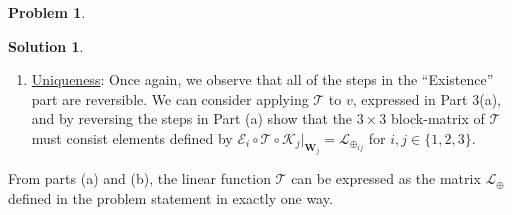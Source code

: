 \documentclass{article}
\theoremstyle{definition}
\newtheorem*{prob*}{Problem}
\newtheorem*{sln*}{Solution}
\newcommand{\V}{\mathbf{V}}
\newcommand{\W}{\mathbf{W}}
\newcommand{\lag}{\mathcal{L}}
\newcommand{\K}{\mathcal{K}}
\newcommand{\E}{\mathcal{E}}
\newcommand{\T}{\mathcal{T}}
\begin{document}
\begin{prob*}
\begin{sln*}
\begin{enumerate}
\begin{enumerate}
\begin{align*}
\begin{bmatrix}
				\Pi_3 \circ \maltese^{-1}\circ \T (w_1) 
				\end{bmatrix}\right)\\
				&= 
				\maltese\circ\maltese^{-1}\circ \T(w_1),\hspace{0.2cm}\text{by Part 2(a) of Problem 1}\\
				&= \T(w_1)
				\end{align*} 
				By the definition of $\maltese$, we can write this as
				\begin{align*}
				\lag(w_1 + \mathbf{0}_\V + \mathbf{0}_\V) = \lag(w_1) = \T(w_1).
				\end{align*}
				In general, the equality above also holds if we start with any $v = w_1 + w_2 + w_3 \in \V$ with $w_i \in \W_i$ for $i=\{1,2,3\}$, because as we have shown in Part 2(a) of Problem 1, $v$ can be written as
				\begin{align*}
				v = \begin{pmatrix}
				w_1\\\mathbf{0}_\V \\ \mathbf{0}_\V
				\end{pmatrix}_\maltese + 
				\begin{pmatrix}
				\mathbf{0}_\V\\w_2 \\ \mathbf{0}_\V
				\end{pmatrix}_\maltese + 
				\begin{pmatrix}
				\mathbf{0}_\V\\\mathbf{0}_\V \\ w_3
				\end{pmatrix}_\maltese,
				\end{align*}
				and the linearity of $\lag$ and $\T$ ensures $\lag(v) = \T(v)$. Hence, $\T$ can expressed as the matrix $\lag$ whose elements are defined as
				\begin{align*}
				\lag_{ij} = \E_i \circ \T \circ \K_j\bigg\vert_{\W_j}.
				\end{align*}
				
				
				\item \underline{Uniqueness}: Once again, we observe that all of the steps in the ``Existence'' part are reversible. We can consider applying $\T$ to $v$, expressed in Part 3(a), and by reversing the steps in Part (a) show that the $3\times 3$ block-matrix of $\T$ must consist elements defined by $\E_i \circ \T \circ \K_j\bigg\vert_{\W_j} = \lag_{\oplus_{ij}}$ for $i,j\in \{1,2,3\}$. \\ 
			\end{enumerate}
		From parts (a) and (b), the linear function $\T$ can be expressed as the matrix $\lag_\oplus$ defined in the problem statement in exactly one way. 
			

\end{enumerate}
\end{sln*}
\end{prob*}
\end{document}
